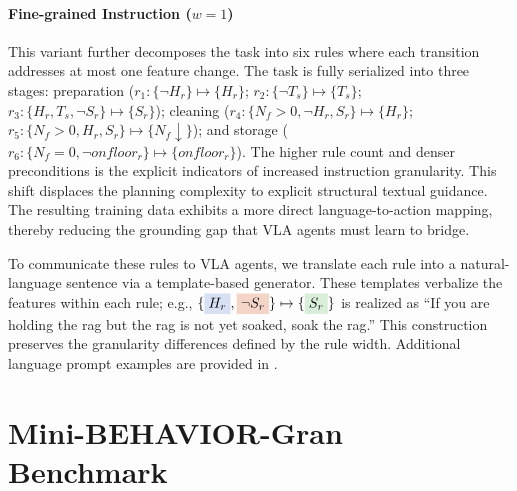 \documentclass{article}
\newcommand{\hlA}[1]{\colorbox{RoyalBlue!15}{#1}}
\newcommand{\hlB}[1]{\colorbox{BrickRed!15}{#1}}
\newcommand{\hlC}[1]{\colorbox{ForestGreen!15}{#1}}
\begin{document}
\paragraph{Fine-grained Instruction ($w=1$)} This variant further decomposes the task into six rules where each transition addresses at most one feature change. The task is fully serialized into three stages: preparation ($r_1: \{\neg H_r\} \mapsto \{H_r\}$; $r_2: \{\neg T_s\} \mapsto \{T_s\}$; $r_3: \{H_r, T_s, \neg S_r\} \mapsto \{S_r\}$); cleaning ($r_4: \{N_f > 0, \neg H_r, S_r\} \mapsto \{H_r\}$; $r_5: \{N_f > 0, H_r, S_r\} \mapsto \{N_f \downarrow\}$); and storage ($r_6: \{N_f = 0, \neg onfloor_{r}\} \mapsto \{onfloor_{r}\}$). The higher rule count and denser preconditions is the explicit indicators of increased instruction granularity. This shift displaces the planning complexity to explicit structural textual guidance. The resulting training data exhibits a more direct language-to-action mapping, thereby reducing the grounding gap that VLA agents must learn to bridge.

To communicate these rules to VLA agents, we translate each rule into a natural-language sentence via a template-based generator. These templates verbalize the features within each rule; e.g., $\{\hlA{$H_r$}, \hlB{$\neg S_r$}\} \mapsto \{\hlC{$S_r$}\}$ is realized as ``If you are \hlA{holding the rag} but \hlB{the rag is not yet soaked}, \hlC{soak the rag}.'' This construction preserves the granularity differences defined by the rule width. Additional language prompt examples are provided in .


\section{Mini-BEHAVIOR-Gran Benchmark}
\label{sec:benchmark}
\end{document}
